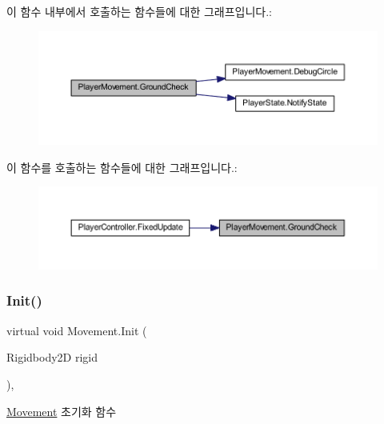 이 함수 내부에서 호출하는 함수들에 대한 그래프입니다.\+:\nopagebreak
\begin{figure}[H]
\begin{center}
\leavevmode
\includegraphics[width=350pt]{d0/d3d/class_player_movement_a957f2e09268831052dbd00a9e8e4fa70_cgraph}
\end{center}
\end{figure}
이 함수를 호출하는 함수들에 대한 그래프입니다.\+:\nopagebreak
\begin{figure}[H]
\begin{center}
\leavevmode
\includegraphics[width=350pt]{d0/d3d/class_player_movement_a957f2e09268831052dbd00a9e8e4fa70_icgraph}
\end{center}
\end{figure}
\mbox{\label{class_movement_a1c50c07edbe274e1cf55253e87506684}} 
\subsubsection{\texorpdfstring{Init()}{Init()}\hspace{0.1cm}{\footnotesize\ttfamily [1/2]}}
{\footnotesize\ttfamily virtual void Movement.\+Init (\begin{DoxyParamCaption}\item[{Rigidbody2D}]{rigid }\end{DoxyParamCaption})\hspace{0.3cm}{\ttfamily [virtual]}, {\ttfamily [inherited]}}



\mbox{\hyperlink{class_movement}{Movement}} 초기화 함수 



